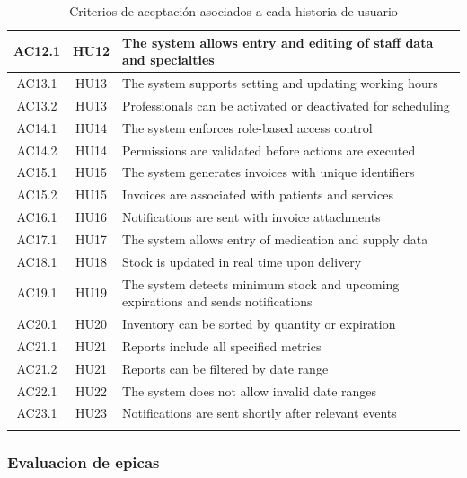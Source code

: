 \begin{longtable}{|c|c|p{9cm}|}
AC12.1 & HU12 & The system allows entry and editing of staff data and specialties \\
\hline

AC13.1 & HU13 & The system supports setting and updating working hours \\
\hline
AC13.2 & HU13 & Professionals can be activated or deactivated for scheduling \\
\hline

AC14.1 & HU14 & The system enforces role-based access control \\
\hline
AC14.2 & HU14 & Permissions are validated before actions are executed \\
\hline

AC15.1 & HU15 & The system generates invoices with unique identifiers \\
\hline
AC15.2 & HU15 & Invoices are associated with patients and services \\
\hline

AC16.1 & HU16 & Notifications are sent with invoice attachments \\
\hline

AC17.1 & HU17 & The system allows entry of medication and supply data \\
\hline

AC18.1 & HU18 & Stock is updated in real time upon delivery \\
\hline

AC19.1 & HU19 & The system detects minimum stock and upcoming expirations and sends notifications \\
\hline

AC20.1 & HU20 & Inventory can be sorted by quantity or expiration \\
\hline

AC21.1 & HU21 & Reports include all specified metrics \\
\hline
AC21.2 & HU21 & Reports can be filtered by date range \\
\hline

AC22.1 & HU22 & The system does not allow invalid date ranges \\
\hline

AC23.1 & HU23 & Notifications are sent shortly after relevant events \\
\hline

\caption{Criterios de aceptación asociados a cada historia de usuario}
\end{longtable}

\subsubsection{Evaluacion de epicas}

